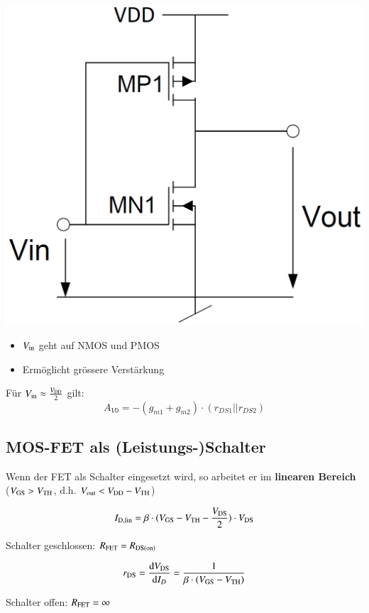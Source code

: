 \begin{minipage}[c]{0.35\columnwidth}
    \includegraphics[width=\columnwidth]{images/push_pull_digital_inverter.png}
\end{minipage}
\hfill
\begin{minipage}[c]{0.5\columnwidth}
    \begin{itemize}
        \item $V_{\rm in}$ geht auf NMOS und PMOS
        \item Ermöglicht grössere Verstärkung
    \end{itemize}
        
    \vspace{0.3cm}
    Für $V_{\rm in} \approx \frac{V_{\rm DD}}{2}$ gilt:
    $$ A_{V0} = -(g_{m1} + g_{m2}) \cdot (r_{DS1} || r_{DS2}) $$
\end{minipage}


\subsection{MOS-FET als (Leistungs-)Schalter}
Wenn der FET als Schalter eingesetzt wird, so arbeitet er im \textbf{linearen Bereich} \\
($V_{\rm GS} > V_{\rm TH}$, d.h. $V_{\rm out} < V_{\rm DD} - V_{\rm TH} $)

\begin{minipage}[c]{0.49\columnwidth}
    $$ I_{\rm D,lin} = \beta \cdot ( V_{\rm GS} - V_{\rm TH} - \frac{V_{\rm DS}}{2} ) \cdot V_{\rm DS} $$
    \begin{center}
        
        Schalter geschlossen: $R_{\rm FET} = R_{\rm DS(on)} $
    \end{center}
\end{minipage}
\hfill
\begin{minipage}[c]{0.49\columnwidth}
    $$ r_{\rm DS} = \dfrac{\mathop{} \! \mathrm{d} V_{\rm DS}}{\mathop{} \! \mathrm{d} I_D} = \frac{1}{\beta \cdot (V_{\rm GS} - V_{\rm TH})}  $$
    \begin{center}
        Schalter offen: $R_{\rm FET} = \infty$ 
    \end{center}
\end{minipage}


